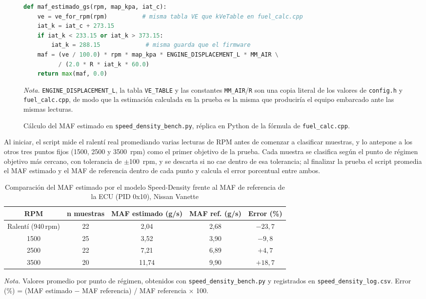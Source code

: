 \begin{figure}[H]
	\centering
	\caption{Cálculo del MAF estimado en \texttt{speed\_density\_bench.py}, réplica en Python de la fórmula de \texttt{fuel\_calc.cpp}.}
	\label{fig:bench_speed_density}
	\begin{lstlisting}[language=Python, basicstyle=\fontsize{9}{10}\ttfamily, breaklines=true]
def maf_estimado_gs(rpm, map_kpa, iat_c):
    ve = ve_for_rpm(rpm)          # misma tabla VE que kVeTable en fuel_calc.cpp
    iat_k = iat_c + 273.15
    if iat_k < 233.15 or iat_k > 373.15:
        iat_k = 288.15             # misma guarda que el firmware
    maf = (ve / 100.0) * rpm * map_kpa * ENGINE_DISPLACEMENT_L * MM_AIR \
          / (2.0 * R * iat_k * 60.0)
    return max(maf, 0.0)
	\end{lstlisting}
	\begin{minipage}{\linewidth}
		\small
		\textit{Nota.} \texttt{ENGINE\_DISPLACEMENT\_L}, la tabla \texttt{VE\_TABLE} y las constantes \texttt{MM\_AIR}/\texttt{R} son una copia literal de los valores de \texttt{config.h} y \texttt{fuel\_calc.cpp}, de modo que la estimación calculada en la prueba es la misma que produciría el equipo embarcado ante las mismas lecturas.
	\end{minipage}
\end{figure}

Al iniciar, el script mide el ralentí real promediando varias lecturas de RPM antes de comenzar a clasificar muestras, y lo antepone a los otros tres puntos fijos (1500, 2500 y 3500~rpm) como el primer objetivo de la prueba. Cada muestra se clasifica según el punto de régimen objetivo más cercano, con tolerancia de $\pm$100~rpm, y se descarta si no cae dentro de esa tolerancia; al finalizar la prueba el script promedia el MAF estimado y el MAF de referencia dentro de cada punto y calcula el error porcentual entre ambos.

\begin{table}[H]
	\centering
	\caption{Comparación del MAF estimado por el modelo Speed-Density frente al MAF de referencia de la ECU (PID 0x10), Nissan Vanette}
	\label{tab:speed_density_resultados}
	\begin{tabular}{ccccc}
		\toprule
		\rowcolor[rgb]{0.851, 0.851, 0.851}
		\textbf{RPM} & \textbf{n muestras} & \textbf{MAF estimado (g/s)} & \textbf{MAF ref. (g/s)} & \textbf{Error (\%)} \\
		\midrule
		Ralentí (940\,rpm) & 22 & 2,04 & 2,68 & $-23{,}7$ \\
		1500 & 25 & 3,52 & 3,90 & $-9{,}8$ \\
		2500 & 22 & 7,21 & 6,89 & $+4{,}7$ \\
		3500 & 20 & 11,74 & 9,90 & $+18{,}7$ \\
		\bottomrule
	\end{tabular}
	\vskip 0.15cm
	{\footnotesize \textit{Nota.} Valores promedio por punto de régimen, obtenidos con \texttt{speed\_density\_bench.py} y registrados en \texttt{speed\_density\_log.csv}. Error (\%) = (MAF estimado $-$ MAF referencia) / MAF referencia $\times$ 100.}
\end{table}

